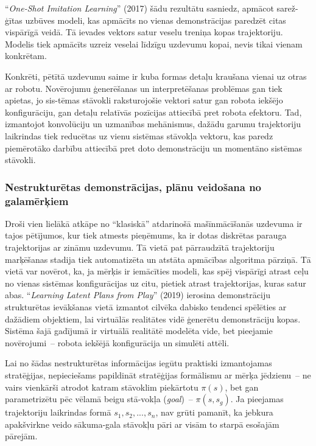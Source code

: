 \documentclass[12pt, a4paper]{article}
\numberwithin{equation}{section} %
\begin{document}
``\textit{One-Shot Imitation Learning}'' \cite{duan2017one} (2017) šādu rezultātu sasniedz, apmācot sarež-ģītas uzbūves modeli, kas apmācīts no vienas demonstrācijas paredzēt citas vispārīgā veidā. Tā ievades vektors satur veselu treniņa kopas trajektoriju. Modelis tiek apmācīts uzreiz veselai līdzīgu uzdevumu kopai, nevis tikai vienam konkrētam.

Konkrēti, pētītā uzdevumu saime ir kuba formas detaļu kraušana vienai uz otras ar robotu. Novērojumu ģenerēšanas un interpretēšanas problēmas gan tiek apietas, jo sis-tēmas stāvokli raksturojošie vektori satur gan robota iekšējo konfigurāciju, gan detaļu relatīvās pozīcijas attiecībā pret robota efektoru. Tad, izmantojot konvolūciju un uzmanības mehānismus, dažādu garumu trajektoriju laikrindas tiek reducētas uz vienu sistēmas stāvokļa vektoru, kas paredz piemērotāko darbību attiecībā pret doto demonstrāciju un momentāno sistēmas stāvokli.

\subsubsection{Nestrukturētas demonstrācijas, plānu veidošana no galamērķiem}

Droši vien lielākā atkāpe no ``klasiskā'' atdarinošā mašīnmācīšanās uzdevuma ir tajos pētījumos, kur tiek atmests pieņēmums, ka ir dotas diskrētas parauga trajektorijas ar zināmu uzdevumu. Tā vietā pat pārraudzītā trajektoriju marķēšanas stadija tiek automatizēta un atstāta apmācības algoritma pārziņā. Tā vietā var novērot, ka, ja mērķis ir iemācīties modeli, kas spēj vispārīgi atrast ceļu no vienas sistēmas konfigurācijas uz citu, pietiek atrast trajektorijas, kuras satur abas. ``\textit{Learning Latent Plans from Play}'' \cite{lynch2020learning} (2019) ierosina demonstrāciju strukturētas ievākšanas vietā izmantot cilvēka dabisko tendenci spēlēties ar dažādiem objektiem, lai virtuālās realitātes vidē ģenerētu demonstrāciju kopas. Sistēma šajā gadījumā ir virtuālā realitātē modelēta vide, bet pieejamie novērojumi~-- robota iekšējā konfigurācija un simulēti attēli.

Lai no šādas nestrukturētas informācijas iegūtu praktiski izmantojamas stratēģijas, nepieciešams papildināt stratēģijas formālismu ar mērķa jēdzienu~-- ne vairs vienkārši atrodot katram stāvoklim piekārtotu $\pi(s)$, bet gan parametrizētu pēc vēlamā beigu stā-vokļa (\textit{goal})~-- $\pi(s,s_{g})$. Ja pieejamas trajektoriju laikrindas formā $s_1, s_2, ..., s_n$, nav grūti pamanīt, ka jebkura apakšvirkne veido sākuma-gala stāvokļu pāri ar visām to starpā esošajām pārejām.
\end{document}
